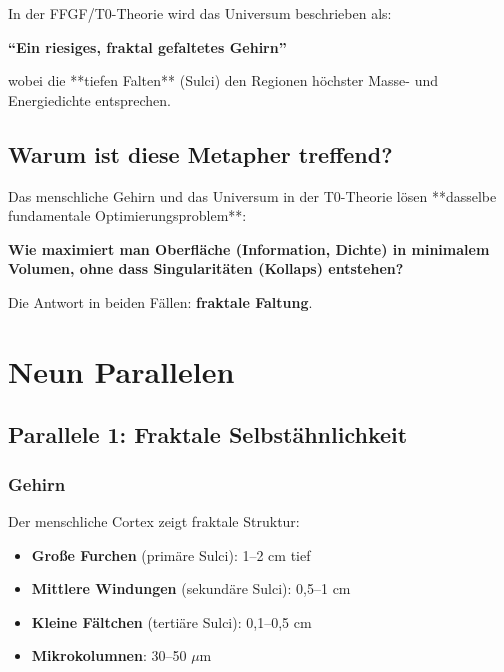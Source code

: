 	In der FFGF/T0-Theorie wird das Universum beschrieben als:

	\begin{center}
		\textbf{\enquote{Ein riesiges, fraktal gefaltetes Gehirn}}
	\end{center}

	wobei die **tiefen Falten** (Sulci) den Regionen höchster Masse- und Energiedichte entsprechen.

	\subsection{Warum ist diese Metapher treffend?}

	\begin{important}
		Das menschliche Gehirn und das Universum in der T0-Theorie lösen **dasselbe fundamentale Optimierungsproblem**:

		\vspace{0.3cm}

		\textbf{Wie maximiert man Oberfläche (Information, Dichte) in minimalem Volumen, ohne dass Singularitäten (Kollaps) entstehen?}

		\vspace{0.3cm}

		Die Antwort in beiden Fällen: \textbf{fraktale Faltung}.
	\end{important}

	\section{Neun Parallelen}

	\subsection{Parallele 1: Fraktale Selbstähnlichkeit}

	\subsubsection{Gehirn}

	Der menschliche Cortex zeigt fraktale Struktur:
	\begin{itemize}
		\item \textbf{Große Furchen} (primäre Sulci): 1--2 cm tief
		\item \textbf{Mittlere Windungen} (sekundäre Sulci): 0,5--1 cm
		\item \textbf{Kleine Fältchen} (tertiäre Sulci): 0,1--0,5 cm
		\item \textbf{Mikrokolumnen}: 30--50 $\mu$m
	\end{itemize}

